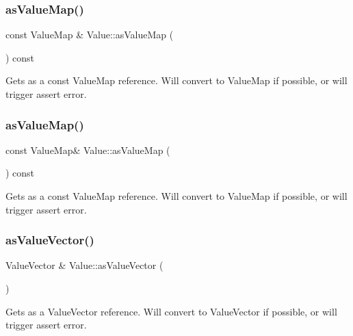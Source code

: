 \subsubsection{\texorpdfstring{as\+Value\+Map()}{asValueMap()}\hspace{0.1cm}{\footnotesize\ttfamily [3/4]}}
{\footnotesize\ttfamily const Value\+Map \& Value\+::as\+Value\+Map (\begin{DoxyParamCaption}{ }\end{DoxyParamCaption}) const}

Gets as a const Value\+Map reference. Will convert to Value\+Map if possible, or will trigger assert error. \mbox{\label{classValue_a4871470948dd04992ed21956f1a0f8fe}} 
\subsubsection{\texorpdfstring{as\+Value\+Map()}{asValueMap()}\hspace{0.1cm}{\footnotesize\ttfamily [4/4]}}
{\footnotesize\ttfamily const Value\+Map\& Value\+::as\+Value\+Map (\begin{DoxyParamCaption}{ }\end{DoxyParamCaption}) const}

Gets as a const Value\+Map reference. Will convert to Value\+Map if possible, or will trigger assert error. \mbox{\label{classValue_a4f26d85d7095500ade6344e2a7a80f38}} 
\subsubsection{\texorpdfstring{as\+Value\+Vector()}{asValueVector()}\hspace{0.1cm}{\footnotesize\ttfamily [1/4]}}
{\footnotesize\ttfamily Value\+Vector \& Value\+::as\+Value\+Vector (\begin{DoxyParamCaption}{ }\end{DoxyParamCaption})}

Gets as a Value\+Vector reference. Will convert to Value\+Vector if possible, or will trigger assert error. \mbox{\label{classValue_a487d044b1073ff7ea4c5b8a47ff393ca}} 
